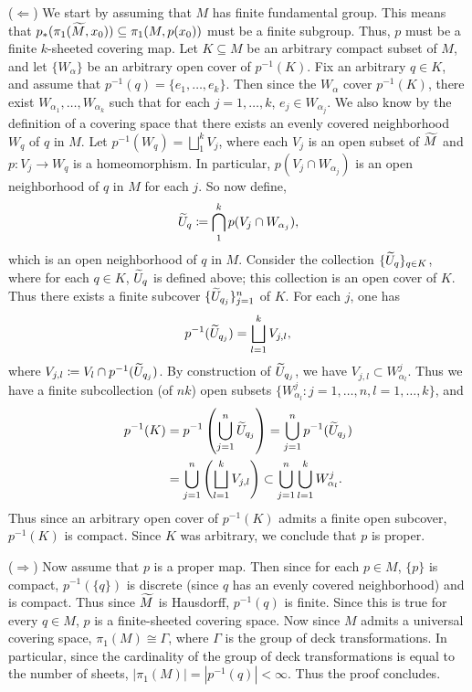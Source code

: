 \documentclass{article}
\begin{document}
	($\Longleftarrow$) We start by assuming that $M$ has finite fundamental group. This means that $p_{\ast}(\pi_{1}(\widetilde{M}, x_0)) \subseteq \pi_1(M, p(x_0))$ must be a finite subgroup. Thus, $p$ must be a finite $k$-sheeted covering map. Let $K \subseteq M$ be an arbitrary compact subset of $M$, and let $\{W_{\alpha}\}$ be an arbitrary open cover of $p^{-1}(K)$. Fix an arbitrary $q \in K$, and assume that $p^{-1}(q) = \{e_1, \ldots, e_k\}$. Then since the $W_\alpha$ cover $p^{-1}(K)$, there exist $W_{\alpha_1}, \ldots, W_{\alpha_k}$ such that for each $j = 1, \ldots, k$, $e_j \in W_{\alpha_j}$. We also know by the definition of a covering space that there exists an evenly covered neighborhood $W_q$ of $q$ in $M$. Let $p^{-1}(W_q) = \bigsqcup_{1}^{k}V_{j}$, where each $V_j$ is an open subset of $\widetilde{M}$ and $p: V_j \to W_q$ is a homeomorphism. In particular, $p(V_j \cap W_{\alpha_j})$ is an open neighborhood of $q$ in $M$ for each $j$. So now define, 
	\begin{equation*}
		\widetilde{U}_{q} \coloneqq \bigcap_{1}^{k}p(V_j \cap W_{\alpha_j}), 
	\end{equation*}
	which is an open neighborhood of $q$ in $M$. Consider the collection $\{\widetilde{U}_{q}\}_{q\in K}$, where for each $q \in K$, $\widetilde{U}_q$ is defined above; this collection is an open cover of $K$. Thus there exists a finite subcover $\{\widetilde{U}_{q_j}\}_{j = 1}^{n}$ of $K$. For each $j$, one has 
	\begin{equation*}
		p^{-1}(\widetilde{U}_{q_{j}}) = \bigsqcup_{l = 1}^{k}V_{j,l}, 
	\end{equation*}
	where $V_{j,l} \coloneqq V_l \cap p^{-1}(\widetilde{U}_{q_j})$. By construction of $\widetilde{U}_{q_j}$, we have $V_{j,l} \subset W_{\alpha_l}^j$. Thus we have a finite subcollection (of $nk$) open subsets $\{W_{\alpha_l}^{j}: j = 1, \ldots, n, l = 1, \ldots, k\}$, and 
	\begin{align*}
		\begin{split}
			p^{-1}(K) &= p^{-1}\left(\bigcup_{j = 1}^{n}\widetilde{U}_{q_{j}}\right) = \bigcup_{j = 1}^{n}p^{-1}(\widetilde{U}_{q_j}) \\
			&= \bigcup_{j = 1}^{n}\left(\bigsqcup_{l = 1}^{k}V_{j,l}\right) \subset \bigcup_{j = 1}^{n}\bigcup_{l = 1}^{k}W_{\alpha_{l}}^{j}. 
		\end{split}
	\end{align*}
	Thus since an arbitrary open cover of $p^{-1}(K)$ admits a finite open subcover, $p^{-1}(K)$ is compact. Since $K$ was arbitrary, we conclude that $p$ is proper. 
	
	($\Longrightarrow$) Now assume that $p$ is a proper map. Then since for each $p \in M$, $\{p\}$ is compact, $p^{-1}(\{q\})$ is discrete (since $q$ has an evenly covered neighborhood) and is compact. Thus since $\widetilde{M}$ is Hausdorff, $p^{-1}(q)$ is finite. Since this is true for every $q \in M$, $p$ is a finite-sheeted covering space. Now since $M$ admits a universal covering space, $\pi_{1}(M) \cong \Gamma$, where $\Gamma$ is the group of deck transformations. In particular, since the cardinality of the group of deck transformations is equal to the number of sheets, $|\pi_1(M)| = |p^{-1}(q)| < \infty$. Thus the proof concludes.
	
\end{document}
